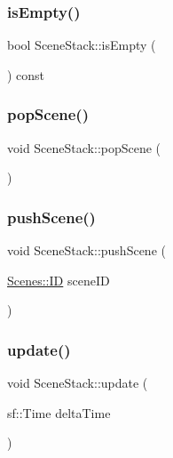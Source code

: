 \hypertarget{class_scene_stack_ade95cce69229a18d169f63093289e865}{}\label{class_scene_stack_ade95cce69229a18d169f63093289e865} 
\subsubsection{\texorpdfstring{is\+Empty()}{isEmpty()}}
{\footnotesize\ttfamily bool Scene\+Stack\+::is\+Empty (\begin{DoxyParamCaption}{ }\end{DoxyParamCaption}) const}

\hypertarget{class_scene_stack_a0ea3309f9ec9120cf51a0bce3881e1e2}{}\label{class_scene_stack_a0ea3309f9ec9120cf51a0bce3881e1e2} 
\subsubsection{\texorpdfstring{pop\+Scene()}{popScene()}}
{\footnotesize\ttfamily void Scene\+Stack\+::pop\+Scene (\begin{DoxyParamCaption}{ }\end{DoxyParamCaption})}

\hypertarget{class_scene_stack_a41366819a998558e3920fe7859d1f114}{}\label{class_scene_stack_a41366819a998558e3920fe7859d1f114} 
\subsubsection{\texorpdfstring{push\+Scene()}{pushScene()}}
{\footnotesize\ttfamily void Scene\+Stack\+::push\+Scene (\begin{DoxyParamCaption}\item[{\hyperlink{namespace_scenes_a0ad7ab6856b1d77d498e3a251f6bb275}{Scenes\+::\+ID}}]{scene\+ID }\end{DoxyParamCaption})}

\hypertarget{class_scene_stack_acdea2588bbc85c2834608ebab6671866}{}\label{class_scene_stack_acdea2588bbc85c2834608ebab6671866} 
\subsubsection{\texorpdfstring{update()}{update()}}
{\footnotesize\ttfamily void Scene\+Stack\+::update (\begin{DoxyParamCaption}\item[{sf\+::\+Time}]{delta\+Time }\end{DoxyParamCaption})}



